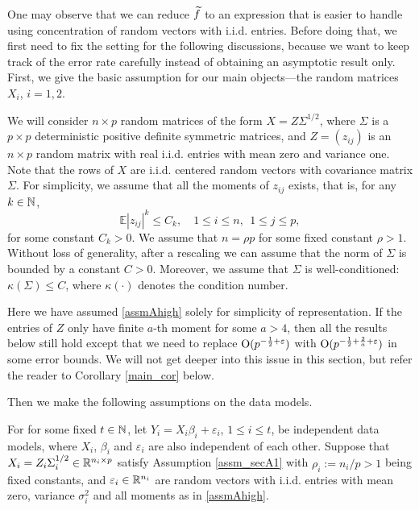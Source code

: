One may observe that we can reduce $\widetilde f$ to an expression that is easier to handle using concentration of random vectors with i.i.d. entries. Before doing that, we first need to fix the setting for the following discussions, because we want to keep track of the error rate carefully instead of obtaining an asymptotic result only. First, we give the basic assumption for our main objects---the random matrices $X_i$, $i=1,2$.

\begin{assumption}\label{assm_secA1}
We will consider $n\times p$ random matrices of the form $X=Z\Sigma^{1/2}$, where $\Sigma$  is a $p\times p$ deterministic positive definite symmetric matrices, and $Z=(z_{ij})$ is an $n\times p$ random matrix with real i.i.d. entries with mean zero and variance one. Note that the rows of $X$ are i.i.d. centered random vectors with covariance matrix $\Sigma$. For simplicity, we assume that all the moments of $z_{ij}$ exists, that is, for any $k\in \mathbb{N}$,
\begin{equation}\label{assmAhigh}
\mathbb{E} |z_{ij}|^k \le C_k ,\quad 1\le i \le n, \ \ 1\le j \le p,
\end{equation}
for some constant $C_k>0$. We assume that $n=\rho p$ for some fixed constant $\rho>1$. Without loss of generality, after a rescaling we can assume that the norm of $\Sigma$ is bounded by a constant $C>0$. Moreover, we assume that $\Sigma$ is well-conditioned: $\kappa(\Sigma)\le C$, where $\kappa(\cdot)$ denotes the condition number. 
\end{assumption}
Here we have assumed \eqref{assmAhigh} solely for simplicity of representation. If the entries of $Z$ only have finite $a$-th moment for some $a>4$, then all the results below still hold except that we need to replace $\operatorname{O}(p^{-\frac12+{\varepsilon}})$ with $\operatorname{O}( p^{-\frac12+\frac2a +\varepsilon})$ in some error bounds. We will not get deeper into this issue in this section, but refer the reader to Corollary \ref{main_cor} below. 

Then we make the following assumptions on the data models.
\begin{assumption}\label{assm_secA2}
For for some fixed $t\in \mathbb{N}$, let $Y_i = X_i\beta_i + \varepsilon_i$, $1\le i \le t$, be independent data models, where $X_i$, $\beta_i$ and $\varepsilon_i$ are also independent of each other. Suppose that $X_i=Z_i\Sigma_i^{1/2}\in \mathbb{R}^{n_i\times p}$ satisfy Assumption \ref{assm_secA1} with $\rho_i:=n_i/p>1$ being fixed constants, and ${\varepsilon}_i\in \mathbb{R}^{n_i}$ are random vectors with i.i.d. entries with mean zero, variance $\sigma_i^2$ and all moments as in \eqref{assmAhigh}. 
\end{assumption}

